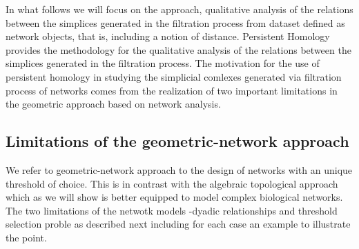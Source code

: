\documentclass[onecollarge,runningheads]{svjour2}
\begin{document}

In what follows we will focus on the approach, qualitative analysis of the relations between the simplices generated in the filtration process from dataset defined as network objects, that is, including a notion of distance. 
Persistent Homology provides the methodology for the qualitative analysis of the relations between the simplices generated in the filtration process. The motivation for the use of persistent homology in studying the simplicial comlexes generated via filtration process of networks comes from the realization of two important limitations in the geometric approach based on network analysis. 


\subsection{Limitations of the geometric-network approach}
\label{se:limita}
We refer to geometric-network approach to the design of networks with an unique threshold of choice. This is in contrast with the algebraic topological approach which as we will show is better equipped to model complex biological networks. The two limitations of the netwotk models -dyadic relationships and threshold selection proble as described next including for each case an example to illustrate the point.
\end{document}

